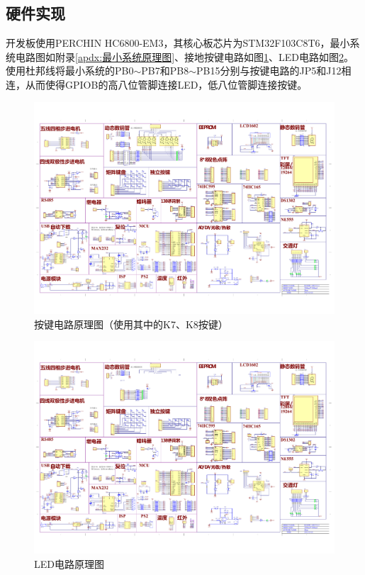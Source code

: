 \documentclass[a4paper]{ctexart}
\begin{document}
\begin{spacing}{1.3}
	\subsection{硬件实现}
	开发板使用PERCHIN HC6800-EM3，其核心板芯片为STM32F103C8T6，最小系统电路图如附录\ref{apdx:最小系统原理图}、接地按键电路如图\ref{fig:按键}、LED电路如图\ref{fig:LED}。使用杜邦线将最小系统的PB0$\sim$PB7和PB8$\sim$PB15分别与按键电路的JP5和J12相连，从而使得GPIOB的高八位管脚连接LED，低八位管脚连接按键。
	\begin{figure}[htbp]
		\centering
		\includegraphics[width=\textwidth]{figure/KEY.pdf}
		\caption{按键电路原理图（使用其中的K7、K8按键）}\label{fig:按键}
	\end{figure}
	\begin{figure}[htbp]
		\centering
		\includegraphics[width=\textwidth]{figure/LED.pdf}
		\caption{LED电路原理图}\label{fig:LED}
	\end{figure}


\end{spacing}
\end{document}
